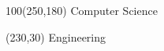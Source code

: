 {
  \begin{frame}
    \begin{textblock}{100}(250,180)
      Computer Science
    \end{textblock}
  \end{frame}
}

{
  \begin{frame}
    \begin{textblock}{30}(230,30)
      Engineering
    \end{textblock}
  \end{frame}
}

